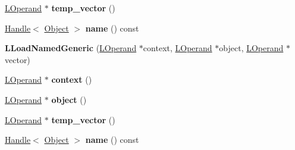 \begin{DoxyCompactItemize}
\item 
\hyperlink{classv8_1_1internal_1_1_l_operand}{L\+Operand} $\ast$ {\bfseries temp\+\_\+vector} ()\hypertarget{classv8_1_1internal_1_1_l_load_named_generic_ac71e90a4f4d755276a1d76ac24d4ef3d}{}\label{classv8_1_1internal_1_1_l_load_named_generic_ac71e90a4f4d755276a1d76ac24d4ef3d}

\item 
\hyperlink{classv8_1_1internal_1_1_handle}{Handle}$<$ \hyperlink{classv8_1_1internal_1_1_object}{Object} $>$ {\bfseries name} () const \hypertarget{classv8_1_1internal_1_1_l_load_named_generic_a328fcd03d981c29639521ee005f3adc7}{}\label{classv8_1_1internal_1_1_l_load_named_generic_a328fcd03d981c29639521ee005f3adc7}

\item 
{\bfseries L\+Load\+Named\+Generic} (\hyperlink{classv8_1_1internal_1_1_l_operand}{L\+Operand} $\ast$context, \hyperlink{classv8_1_1internal_1_1_l_operand}{L\+Operand} $\ast$object, \hyperlink{classv8_1_1internal_1_1_l_operand}{L\+Operand} $\ast$vector)\hypertarget{classv8_1_1internal_1_1_l_load_named_generic_a6994bc2c7c479c721ec11114ed19423c}{}\label{classv8_1_1internal_1_1_l_load_named_generic_a6994bc2c7c479c721ec11114ed19423c}

\item 
\hyperlink{classv8_1_1internal_1_1_l_operand}{L\+Operand} $\ast$ {\bfseries context} ()\hypertarget{classv8_1_1internal_1_1_l_load_named_generic_a61d03d8bff411819ec103caee4b20d95}{}\label{classv8_1_1internal_1_1_l_load_named_generic_a61d03d8bff411819ec103caee4b20d95}

\item 
\hyperlink{classv8_1_1internal_1_1_l_operand}{L\+Operand} $\ast$ {\bfseries object} ()\hypertarget{classv8_1_1internal_1_1_l_load_named_generic_ac545174d6ce0223254278aa25992bcf1}{}\label{classv8_1_1internal_1_1_l_load_named_generic_ac545174d6ce0223254278aa25992bcf1}

\item 
\hyperlink{classv8_1_1internal_1_1_l_operand}{L\+Operand} $\ast$ {\bfseries temp\+\_\+vector} ()\hypertarget{classv8_1_1internal_1_1_l_load_named_generic_ac71e90a4f4d755276a1d76ac24d4ef3d}{}\label{classv8_1_1internal_1_1_l_load_named_generic_ac71e90a4f4d755276a1d76ac24d4ef3d}

\item 
\hyperlink{classv8_1_1internal_1_1_handle}{Handle}$<$ \hyperlink{classv8_1_1internal_1_1_object}{Object} $>$ {\bfseries name} () const \hypertarget{classv8_1_1internal_1_1_l_load_named_generic_a328fcd03d981c29639521ee005f3adc7}{}\label{classv8_1_1internal_1_1_l_load_named_generic_a328fcd03d981c29639521ee005f3adc7}


\end{DoxyCompactItemize}
